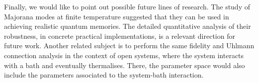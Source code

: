   Finally, we would like to point out possible future lines of research. The study of Majorana modes at finite temperature suggested that they can be used in achieving realistic quantum memories. The detailed quantitative analysis of their robustness, in concrete practical implementations, is a relevant direction for future work. Another related subject is to perform the same fidelity and Uhlmann connection analysis in the context of open systems, where the system interacts with a bath and eventually thermalises. There, the parameter space would also include the parameters associated to the system-bath interaction.


%
%
%
%
%
%
%
